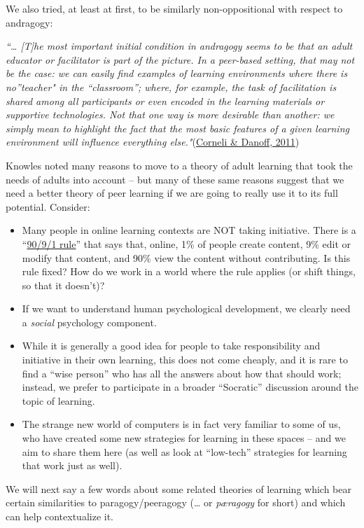 We also tried, at least at first, to be similarly non-oppositional with
respect to andragogy:

\emph{``\ldots{} {[}T{]}he most important initial condition in andragogy
seems to be that an adult educator or facilitator is part of the
picture. In a peer-based setting, that may not be the case: we can
easily find examples of learning environments where there is
no''teacher" in the ``classroom''; where, for example, the task of
facilitation is shared among all participants or even encoded in the
learning materials or supportive technologies. Not that one way is more
desirable than another: we simply mean to highlight the fact that the
most basic features of a given learning environment will influence
everything else."}(\href{http://paragogy.net/ParagogyPaper1}{Corneli \&
Danoff, 2011})

Knowles noted many reasons to move to a theory of adult learning that
took the needs of adults into account -- but many of these same reasons
suggest that we need a better theory of peer learning if we are going to
really use it to its full potential. Consider:

\begin{itemize}
\item
  Many people in online learning contexts are NOT taking initiative.
  There is a
  ``\href{http://www.useit.com/alertbox/participation\_inequality.html}{90/9/1
  rule}'' that says that, online, 1\% of people create content, 9\% edit
  or modify that content, and 90\% view the content without
  contributing. Is this rule fixed? How do we work in a world where the
  rule applies (or shift things, so that it doesn't)?
\item
  If we want to understand human psychological development, we clearly
  need a \emph{social} psychology component.
\item
  While it is generally a good idea for people to take responsibility
  and initiative in their own learning, this does not come cheaply, and
  it is rare to find a ``wise person'' who has all the answers about how
  that should work; instead, we prefer to participate in a broader
  ``Socratic'' discussion around the topic of learning.
\item
  The strange new world of computers is in fact very familiar to some of
  us, who have created some new strategies for learning in these spaces
  -- and we aim to share them here (as well as look at ``low-tech''
  strategies for learning that work just as well).
\end{itemize}
We will next say a few words about some related theories of learning
which bear certain similarities to paragogy/peeragogy (\ldots{} or
\emph{pæragogy} for short) and which can help contextualize it.

